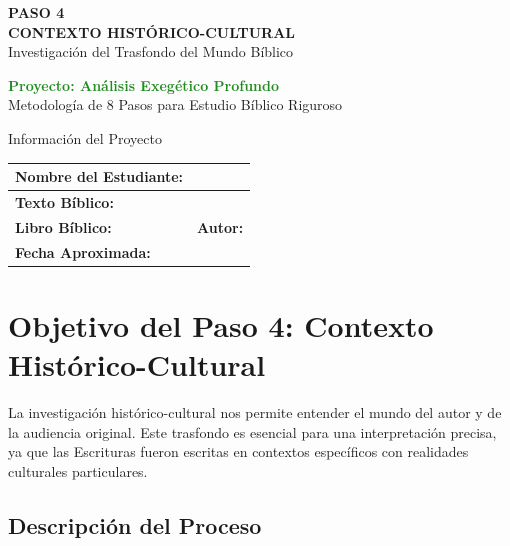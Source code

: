 \documentclass[11pt,a4paper]{article}
\begin{document}
\begin{center}
    {\Huge\color{forestgreen}\textbf{PASO 4}}\\[0.5cm]
    {\Large\color{sagegreen}\textbf{CONTEXTO HISTÓRICO-CULTURAL}}\\[0.3cm]
    {\large\color{papergray}Investigación del Trasfondo del Mundo Bíblico}\\[1cm]
    
    \begin{tcolorbox}[colback=olivegreen!10, colframe=olivegreen, width=0.8\textwidth]
        \centering
        \textcolor{forestgreen}{\textbf{Proyecto: Análisis Exegético Profundo}}\\
        \textcolor{papergray}{Metodología de 8 Pasos para Estudio Bíblico Riguroso}
    \end{tcolorbox}
\end{center}

\vspace{1cm}

\begin{infobox}{Información del Proyecto}
\begin{tabularx}{\textwidth}{|X|X|}
\hline
\textbf{Nombre del Estudiante:} & \hspace{6cm} \\[0.8cm]
\hline
\textbf{Texto Bíblico:} & \hspace{6cm} \\[0.8cm]
\hline
\textbf{Libro Bíblico:} & \hspace{3cm} \quad \textbf{Autor:} \hspace{3cm} \\[0.8cm]
\hline
\textbf{Fecha Aproximada:} & \hspace{6cm} \\[0.8cm]
\hline
\end{tabularx}
\end{infobox}

\section{Objetivo del Paso 4: Contexto Histórico-Cultural}

La investigación histórico-cultural nos permite entender el mundo del autor y de la audiencia original. Este trasfondo es esencial para una interpretación precisa, ya que las Escrituras fueron escritas en contextos específicos con realidades culturales particulares.

\subsection{Descripción del Proceso}
\end{document}
